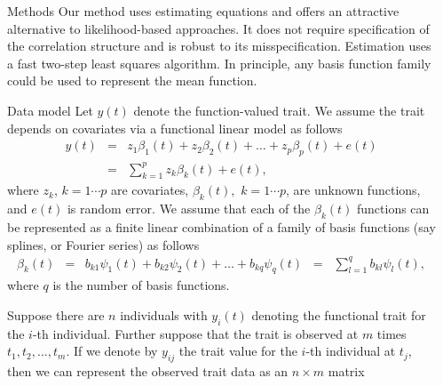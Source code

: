 \documentclass[final,plain]{beamer}
\newlength{\sepwid}
\newlength{\onecolwid}
\begin{document}
\begin{frame}[t]
\begin{columns}[t]
\begin{column}{\sepwid}
  \end{column}                 %

    \begin{column}{\onecolwid}

      \begin{alertblock}{Methods}
        Our method uses estimating equations and offers an attractive
        alternative to likelihood-based approaches.  It does not
        require specification of the correlation structure and is
        robust to its misspecification.  Estimation uses a fast
        two-step least squares algorithm.  In principle, any basis
        function family could be used to represent the mean function.
      \end{alertblock}

      \begin{block}{Data model}
        Let $y(t)$ denote the function-valued trait.  We assume the
        trait depends on covariates via a functional linear model as
        follows
        \begin{eqnarray}
          y(t) &=& z_1\beta_1(t) + z_2\beta_2(t) + \ldots +
          z_p\beta_p(t) + e(t) \nonumber\\&=& \sum_{k=1}^{p}
          z_k\beta_k(t) + e(t), \label{eq:model}
        \end{eqnarray}
        where $z_k$, $k=1\cdots p$ are covariates, $\beta_k(t),$
         $k=1\cdots p$, are unknown functions, and $e(t)$ is random
         error.  We assume that each of the $\beta_k(t)$ functions can
         be represented as a finite linear combination of a family of
         basis functions (say splines, or Fourier series)
         as follows
         \begin{eqnarray}
           \beta_k(t) &=& b_{k1}\psi_1(t) + b_{k2}\psi_2(t) + \ldots +
           b_{kq}\psi_q(t) \;\;=\;\; \sum_{l=1}^{q} b_{kl}\psi_l(t),
         \end{eqnarray}
         where $q$ is the number of basis functions. 

         Suppose there are $n$ individuals with $y_i(t)$ denoting the
         functional trait for the $i$-th individual.  Further suppose
         that the trait is observed at $m$ times $t_1, t_2, \ldots,
         t_m$.  If we denote by $y_{ij}$ the trait value for the
         $i$-th individual at $t_j$, then we can represent the
         observed trait data as an $n \times m$ matrix


\end{block}
\end{column}
\end{columns}
\end{frame}
\end{document}
